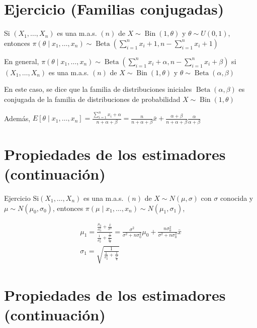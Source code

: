 \section*{Ejercicio (Familias conjugadas)}
Si $\left(X_{1}, \ldots, X_{n}\right)$ es una m.a.s. $(n)$ de $X \sim \operatorname{Bin}(1, \theta)$ y $\theta \sim U(0,1)$, entonces $\pi\left(\theta \mid x_{1}, \ldots, x_{n}\right) \sim \operatorname{Beta}\left(\sum_{i=1}^{n} x_{i}+1, n-\sum_{i=1}^{n} x_{i}+1\right)$

En general, $\pi\left(\theta \mid x_{1}, \ldots, x_{n}\right) \sim \operatorname{Beta}\left(\sum_{i=1}^{n} x_{i}+\alpha, n-\sum_{i=1}^{n} x_{i}+\beta\right)$ si $\left(X_{1}, \ldots, X_{n}\right)$ es una m.a.s. $(n)$ de $X \sim \operatorname{Bin}(1, \theta)$ y $\theta \sim \operatorname{Beta}(\alpha, \beta)$

En este caso, se dice que la familia de distribuciones iniciales $\operatorname{Beta}(\alpha, \beta)$ es conjugada de la familia de distribuciones de probabilidad $X \sim \operatorname{Bin}(1, \theta)$

Además, $E\left[\theta \mid x_{1}, \ldots, x_{n}\right]=\frac{\sum_{i=1}^{n} x_{i}+\alpha}{n+\alpha+\beta}=\frac{n}{n+\alpha+\beta} \bar{x}+\frac{\alpha+\beta}{n+\alpha+\beta} \frac{\alpha}{\alpha+\beta}$

\section*{Propiedades de los estimadores (continuación)}
Ejercicio $\mathrm{Si}\left(X_{1}, \ldots, X_{n}\right)$ es una m.a.s. $(n)$ de $X \sim N(\mu, \sigma)$ con $\sigma$ conocida y $\mu \sim N\left(\mu_{0}, \sigma_{0}\right)$, entonces $\pi\left(\mu \mid x_{1}, \ldots, x_{n}\right) \sim N\left(\mu_{1}, \sigma_{1}\right)$,

$$
	\begin{gathered}
		\mu_{1}=\frac{\frac{\mu_{0}}{\sigma_{0}^{2}}+\frac{\bar{x}}{\sigma^{2}}}{\frac{1}{\sigma_{0}^{2}}+\frac{\frac{1}{\sigma^{2}}}{\frac{\sigma^{n}}{n}}}=\frac{\sigma^{2}}{\sigma^{2}+n \sigma_{0}^{2}} \mu_{0}+\frac{n \sigma_{0}^{2}}{\sigma^{2}+n \sigma_{0}^{2}} \bar{x} \\
		\sigma_{1}=\sqrt{\frac{1}{\frac{1}{\sigma_{0}^{2}}+\frac{1}{\frac{\sigma^{2}}{n}}}}
	\end{gathered}
$$

\section*{Propiedades de los estimadores (continuación)}
